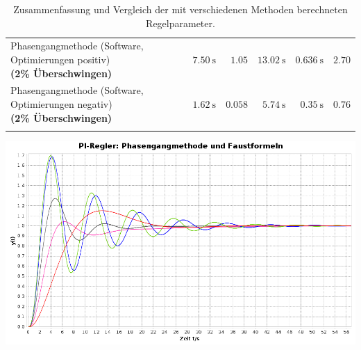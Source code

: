 \begin{longtable}{p{85mm}rrrrr}
    \addlinespace[0.5em]

    \pbox{84mm}{Phasengangmethode (Software, Optimierungen positiv) \\ \small{\textbf{(2\% \"Uberschwingen)}} \\}
    &
    $\SI{7.50}{\second}$
    &
    $1.05$
    &
    $\SI{13.02}{\second}$
    &
    $\SI{0.636}{\second}$
    &
    $2.70$
    \\

    \addlinespace[0.5em]

    \pbox{84mm}{Phasengangmethode (Software, Optimierungen negativ) \\ \small{\textbf{(2\% \"Uberschwingen)}} \\}
    &
    $\SI{1.62}{\second}$
    &
    $0.058$
    &
    $\SI{5.74}{\second}$
    &
    $\SI{0.35}{\second}$
    &
    $0.76$
    \\

    \addlinespace[0.5em]


    \bottomrule
    \caption{%
        Zusammenfassung     und     Vergleich    der     mit     verschiedenen
        Methoden     berechneten    Regelparameter.
    }
\label{tab:allresults}
\end{longtable}


\begin{minipage}[c][][b]{.75\textwidth}
    \includegraphics[width=\textwidth]{images/comparisonPI015.png}
\end{minipage}
\begin{minipage}[c][][b]{.22\textwidth}
    \label{fig:comparisonPI015}
\end{minipage}

